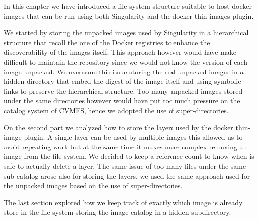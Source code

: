 In this chapter we have introduced a file-system structure suitable to host
docker images that can be run using both Singularity and the docker thin-images
plugin.

We started by storing the unpacked images used by Singularity in a hierarchical
structure that recall the one of the Docker registries to enhance the
discoverability of the images itself. This approach however would have make
difficult to maintain the repository since we would not know the version of
each image unpacked. We overcome this issue storing the real unpacked images in
a hidden directory that embed the digest of the image itself and using symbolic
links to preserve the hierarchical structure. Too many unpacked images stored
under the same directories however would have put too much pressure on the
catalog system of CVMFS, hence we adopted the use of super-directories.

On the second part we analyzed how to store the layers used by the docker
thin-image plugin. A single layer can be used by multiple images this allowed
us to avoid repeating work but at the same time it makes more complex removing
an image from the file-system. We decided to keep a reference count to know
when is safe to actually delete a layer. The same issue of too many files under
the same sub-catalog arose also for storing the layers, we used the same
approach used for the unpacked images based on the use of super-directories.

The last section explored how we keep track of exactly which image is already
store in the file-system storing the image catalog in a hidden subdirectory.
